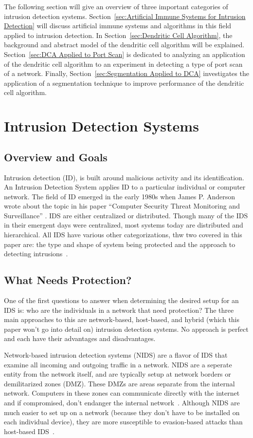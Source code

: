 \documentclass{umm-senior-sem}
\begin{document}
The following section will give an overview of three important categories of intrusion detection systems. Section~\ref{sec:Artificial Immune Systems for Intrusion Detection} will discuss artificial immune systems and algorithms in this field applied to intrusion detection. In Section~\ref{sec:Dendritic Cell Algorithm}, the background and abstract model of the dendritic cell algorithm will be explained. Section~\ref{sec:DCA Applied to Port Scan} is dedicated to analyzing an application of the dendritic cell algorithm to an experiment in detecting a type of port scan of a network. Finally, Section~\ref{sec:Segmentation Applied to DCA} investigates the application of a segmentation technique to improve performance of the dendritic cell algorithm.


\section{Intrusion Detection Systems}
\label{sec:Intrusion Detection Systems}
\subsection{Overview and Goals}
Intrusion detection (ID), is built around malicious activity and its identification. An Intrusion Detection System applies ID to a particular individual or computer network. The field of ID emerged in the early 1980s when James P. Anderson wrote about the topic in his paper ``Computer Security Threat Monitoring and Surveillance'' 
\cite{IDSoverview:2011}.
IDS are either centralized or distributed. Though many of the IDS in their emergent days were centralized, most systems today are distributed and hierarchical. 
All IDS have various other categorizations, thw two covered in this paper are: the type and shape of system being protected and the approach to detecting intrusions~\cite{NIDSandHIDS:2005}.

\subsection{What Needs Protection?}
One of the first questions to answer when determining the desired setup for an IDS is: who are the individuals in a network that need protection? The three main approaches to this are network-based, host-based, and hybrid (which this paper won't go into detail on) intrusion detection systems. No approach is perfect and each have their advantages and disadvantages.

Network-based intrusion detection systems (NIDS) are a flavor of IDS that examine all incoming and outgoing traffic in a network. NIDS are a seperate entity from the network itself, and are typically setup at network borders or demilitarized zones (DMZ). 
These DMZs are areas separate from the internal network. Computers in these zones can communicate directly with the internet and if compromised, don't endanger the internal network~\cite{DMZ:2005}.
Although NIDS are much easier to set up on a network (because they don't have to be installed on each individual device), they are more susceptible to evasion-based attacks than host-based IDS~\cite{NIDSandHIDS:2005}.
\end{document}
